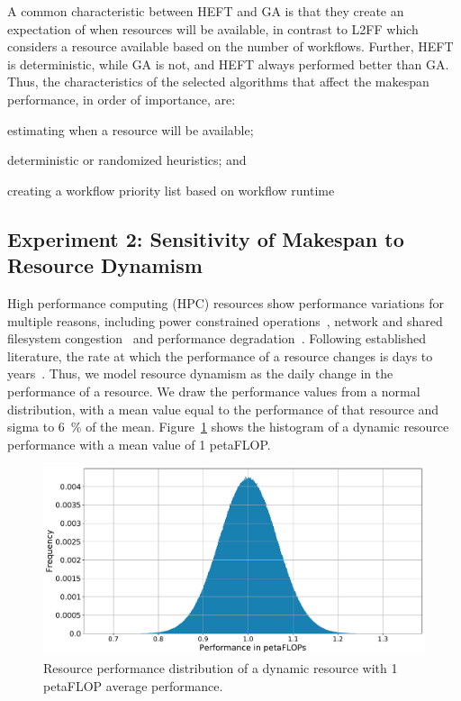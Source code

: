 A common characteristic between HEFT and GA is that they create an expectation
of when resources will be available, in contrast to L2FF which considers a
resource available based on the number of workflows.
Further, HEFT is deterministic, while GA is not, and HEFT always performed
better than GA.
Thus, the characteristics of the selected algorithms that affect the
makespan performance, in order of importance, are:
\begin{inparaenum}[(1)]
    \item estimating when a resource will be available;
    \item deterministic or randomized heuristics; and
    \item creating a workflow priority list based on workflow runtime
\end{inparaenum}

\subsection{Experiment 2: Sensitivity of Makespan to Resource Dynamism}
\label{ssec:res_dyn}
High performance computing (HPC) resources show performance variations for
multiple reasons, including power constrained
operations~\cite{inadomi2015analyzing}, network and shared filesystem
congestion~\cite{brown2018interference} and performance
degradation~\cite{wu2017survey}. Following established literature, the rate at
which the performance of a resource changes is days to
years~\cite{skinner2005understanding}. Thus, we model resource dynamism as the
daily change in the performance of a resource. We draw the performance values
from a normal distribution, with a mean value equal to the performance of that
resource and sigma to 6~\% of the mean.
Figure~\ref{fig:dynamic_res} shows the histogram of a dynamic resource
performance with a mean value of 1 petaFLOP.

\begin{figure}[t]
    \centering
    \includegraphics[width=.75\textwidth]{figures/campaign/DynRes.pdf}
    \caption{Resource performance distribution of a dynamic resource with 1
    petaFLOP average performance.}
    \label{fig:dynamic_res}
\end{figure}

